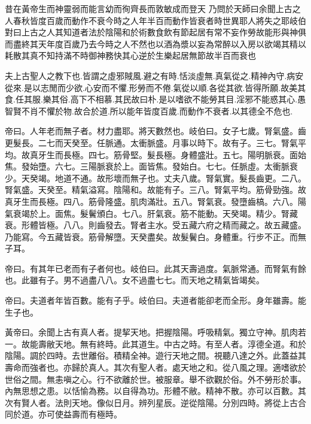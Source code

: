 \documentclass[fontset=none]{utbook}
\begin{document}
\textsf{昔在黃帝生而神靈弱而能言幼而徇齊長而敦敏成而登天} 乃問於天師曰余聞上古之人春秋皆度百歲而動作不衰今時之人年半百而動作皆衰者時世異耶人將失之耶岐伯對曰上古之人其知道者法於陰陽和於術數食飲有節起居有常不妄作勞故能形與神俱而盡終其天年度百歲乃去今時之人不然也以酒為漿以妄為常醉以入房以欲竭其精以耗散其真不知持滿不時御神務快其心逆於生樂起居無節故半百而衰也

夫上古聖人之教下也.皆謂之虛邪賊風.避之有時.恬淡虛無.真氣從之.精神內守.病安從來.是以志閒而少欲.心安而不懼.形勞而不倦.氣從以順.各從其欲.皆得所願.故美其食.任其服.樂其俗.高下不相慕.其民故曰朴.是以嗜欲不能勞其目.淫邪不能惑其心.愚智賢不肖不懼於物.故合於道.所以能年皆度百歲.而動作不衰者.以其德全不危也.

帝曰。人年老而無子者。材力盡耶。將天數然也。岐伯曰。女子七歲。腎氣盛。齒更髮長。二七而天癸至。任脈通。太衝脈盛。月事以時下。故有子。三七。腎氣平均。故真牙生而長極。四七。筋骨堅。髮長極。身體盛壯。五七。陽明脈衰。面始焦。發始墮。六七。三陽脈衰於上。面皆焦。發始白。七七。任脈虛。太衝脈衰少。天癸竭。地道不通。故形壞而無子也。丈夫八歲。腎氣實。髮長齒更。二八。腎氣盛。天癸至。精氣溢寫。陰陽和。故能有子。三八。腎氣平均。筋骨勁強。故真牙生而長極。四八。筋骨隆盛。肌肉滿壯。五八。腎氣衰。發墮齒槁。六八。陽氣衰竭於上。面焦。髮鬢頒白。七八。肝氣衰。筋不能動。天癸竭。精少。腎藏衰。形體皆極。八八。則齒發去。腎者主水。受五藏六府之精而藏之。故五藏盛。乃能寫。今五藏皆衰。筋骨解墮。天癸盡矣。故髮鬢白。身體重。行步不正。而無子耳。

帝曰。有其年已老而有子者何也。岐伯曰。此其天壽過度。氣脈常通。而腎氣有餘也。此雖有子。男不過盡八八。女不過盡七七。而天地之精氣皆竭矣。

帝曰。夫道者年皆百數。能有子乎。岐伯曰。夫道者能卻老而全形。身年雖壽。能生子也。

黃帝曰。余聞上古有真人者。提挈天地。把握陰陽。呼吸精氣。獨立守神。肌肉若一。故能壽敝天地。無有終時。此其道生。中古之時。有至人者。淳德全道。和於陰陽。調於四時。去世離俗。積精全神。遊行天地之間。視聽八達之外。此蓋益其壽命而強者也。亦歸於真人。其次有聖人者。處天地之和。從八風之理。適嗜欲於世俗之間。無恚嗔之心。行不欲離於世。被服章。舉不欲觀於俗。外不勞形於事。內無思想之患。以恬愉為務。以自得為功。形體不敝。精神不散。亦可以百數。其次有賢人者。法則天地。像似日月。辨列星辰。逆從陰陽。分別四時。將從上古合同於道。亦可使益壽而有極時。
\end{document}
